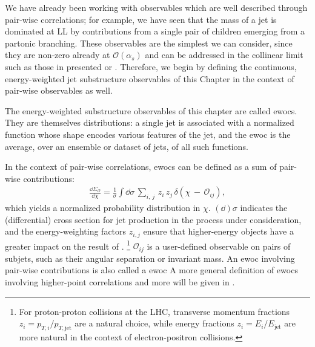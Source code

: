 We have already been working with observables which are well described through pair-wise correlations;
%
for example, we have seen that the mass of a jet is dominated at LL by contributions from a single pair of children emerging from a partonic branching.
%
These observables are the simplest we can consider, since they are non-zero already at \(\mathcal{O}(\alpha_s)\) and can be addressed in the collinear limit such as those in presented  or .
%
Therefore, we begin by defining the continuous, energy-weighted jet substructure observables of this Chapter in the context of pair-wise observables as well.

The energy-weighted substructure observables of this chapter are called \glspl{ewoc}.
%
They are themselves distributions:
%
a single jet is associated with a normalized function whose shape encodes various features of the jet, and the \gls{ewoc} is the average, over an ensemble or dataset of jets, of all such functions.

In the context of pair-wise correlations, \glspl{ewoc} can be defined as a sum of pair-wise contributions:
\begin{align}
    \label{eq:intro_ewoc_def}
    \frac{\dd \Sigma_\mathcal{O}}{\dd \chi}
    =
    \frac{1}{\sigma}
    \int \dd\sigma \,
    \sum_{
        i,\, j
    } \,
    z_i \, z_j \,
    \delta\left(\chi \, - \, \mathcal{O}_{ij}\right)
    ,
\end{align}
which yields a normalized probability distribution in \(\chi\).
%
\((\dd)\sigma\) indicates the (differential) cross section for jet production in the process under consideration, and the energy-weighting factors \(z_{i,j}\) ensure that higher-energy objects have a greater impact on the result of .%
\footnote{
    For proton-proton collisions at the LHC, transverse momentum fractions \(z_i = p_{T,i}/p_{T,\text{jet}}\) are a natural choice, while energy fractions \(z_{i} = E_{i}/E_\text{jet}\) are more natural in the context of electron-positron collisions.
}
%
\(\mathcal{O}_{ij}\) is a user-defined  observable on pairs of subjets, such as their angular separation or invariant mass.
%
An \gls{ewoc} involving pair-wise contributions is also called a  \gls{ewoc}
%
A more general definition of \glspl{ewoc} involving higher-point correlations and more will be given in .

